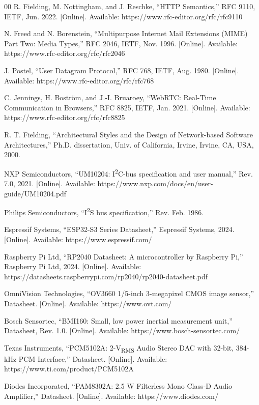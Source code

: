 \documentclass[journal]{IEEEtran}
\begin{document}
\begin{thebibliography}{00}
 R. Fielding, M. Nottingham, and J. Reschke, ``HTTP Semantics,'' RFC 9110, IETF, Jun. 2022. [Online]. Available: https://www.rfc-editor.org/rfc/rfc9110

 N. Freed and N. Borenstein, ``Multipurpose Internet Mail Extensions (MIME) Part Two: Media Types,'' RFC 2046, IETF, Nov. 1996. [Online]. Available: https://www.rfc-editor.org/rfc/rfc2046

 J. Postel, ``User Datagram Protocol,'' RFC 768, IETF, Aug. 1980. [Online]. Available: https://www.rfc-editor.org/rfc/rfc768

 C. Jennings, H. Bostr{\"o}m, and J.-I. Bruaroey, ``WebRTC: Real-Time Communication in Browsers,'' RFC 8825, IETF, Jan. 2021. [Online]. Available: https://www.rfc-editor.org/rfc/rfc8825

 R. T. Fielding, ``Architectural Styles and the Design of Network-based Software Architectures,'' Ph.D. dissertation, Univ. of California, Irvine, Irvine, CA, USA, 2000.

 NXP Semiconductors, ``UM10204: I\textsuperscript{2}C-bus specification and user manual,'' Rev. 7.0, 2021. [Online]. Available: https://www.nxp.com/docs/en/user-guide/UM10204.pdf

 Philips Semiconductors, ``I\textsuperscript{2}S bus specification,'' Rev. Feb. 1986.

 Espressif Systems, ``ESP32-S3 Series Datasheet,'' Espressif Systems, 2024. [Online]. Available: https://www.espressif.com/

 Raspberry Pi Ltd, ``RP2040 Datasheet: A microcontroller by Raspberry Pi,'' Raspberry Pi Ltd, 2024. [Online]. Available: https://datasheets.raspberrypi.com/rp2040/rp2040-datasheet.pdf

 OmniVision Technologies, ``OV3660 1/5-inch 3-megapixel CMOS image sensor,'' Datasheet. [Online]. Available: https://www.ovt.com/

 Bosch Sensortec, ``BMI160: Small, low power inertial measurement unit,'' Datasheet, Rev. 1.0. [Online]. Available: https://www.bosch-sensortec.com/

 Texas Instruments, ``PCM5102A: 2-V\textsubscript{RMS} Audio Stereo DAC with 32-bit, 384-kHz PCM Interface,'' Datasheet. [Online]. Available: https://www.ti.com/product/PCM5102A

 Diodes Incorporated, ``PAM8302A: 2.5 W Filterless Mono Class-D Audio Amplifier,'' Datasheet. [Online]. Available: https://www.diodes.com/


\end{thebibliography}
\end{document}
